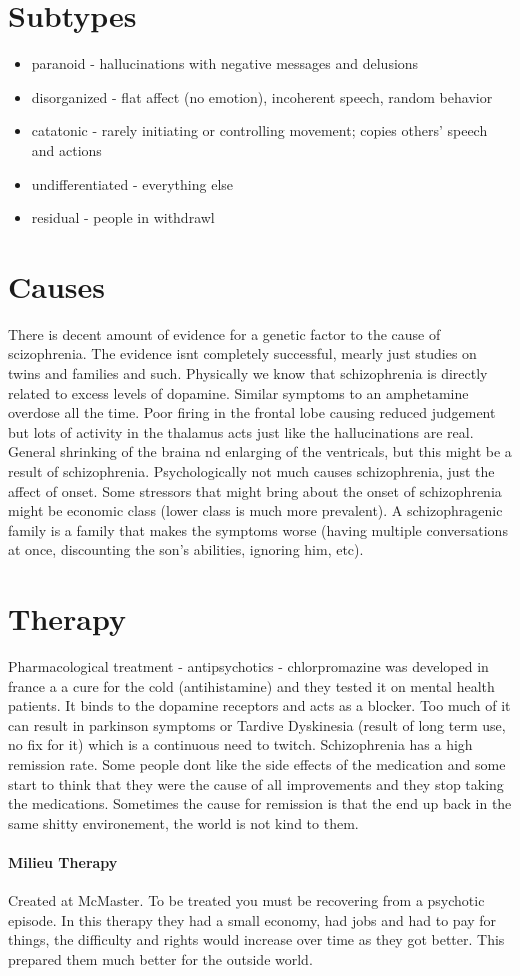 \documentclass[12pt]{article}
\begin{document}
\section*{Subtypes}
\begin{itemize}
\item paranoid - hallucinations with negative messages and delusions
\item disorganized - flat affect (no emotion), incoherent speech, random behavior
\item catatonic - rarely initiating or controlling movement; copies others' speech and actions
\item undifferentiated - everything else
\item residual - people in withdrawl
\end{itemize}


\section*{Causes}
There is decent amount of evidence for a genetic factor to the cause of scizophrenia. The evidence isnt completely successful, mearly just studies on twins and families and such. Physically we know that schizophrenia is directly related to excess levels of dopamine. Similar symptoms to an amphetamine overdose all the time. Poor firing in the frontal lobe causing reduced judgement but lots of activity in the thalamus acts just like the hallucinations are real. General shrinking of the braina nd enlarging of the ventricals, but this might be a result of schizophrenia. Psychologically not much causes schizophrenia, just the affect of onset. Some stressors that might bring about the onset of schizophrenia might be economic class (lower class is much more prevalent). A schizophragenic family is a family that makes the symptoms worse (having multiple conversations at once, discounting the son's abilities, ignoring him, etc).

\section*{Therapy}
 Pharmacological treatment - antipsychotics - chlorpromazine was developed in france a a cure for the cold (antihistamine) and they tested it on mental health patients. It binds to the dopamine receptors and acts as a blocker. Too much of it can result in parkinson symptoms or Tardive Dyskinesia (result of long term use, no fix for it) which is a continuous need to twitch. Schizophrenia has a high remission rate. Some people dont like the side effects of the medication and some start to think that they were the cause of all improvements and they stop taking the medications. Sometimes the cause for remission is that the end up back in the same shitty environement, the world is not kind to them.
 \paragraph*{Milieu Therapy} Created at McMaster. To be treated you must be recovering from a psychotic episode. In this therapy they had a small economy, had jobs and had to pay for things, the difficulty and rights would increase over time as they got better. This prepared them much better for the outside world.  
\end{document}
